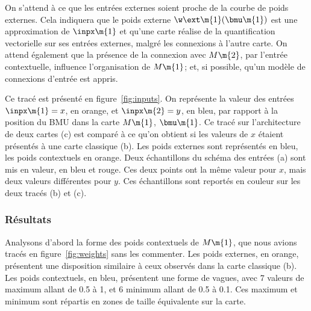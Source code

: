 On s'attend à ce que les entrées externes soient proche de la courbe de poids externes. Cela indiquera que le poids externe $\w\ext\m{1}(\bmu\m{1})$ est une approximation de $\inpx\m{1}$ et qu'une carte réalise de la quantification vectorielle sur ses entrées externes, malgré les connexions à l'autre carte. On attend également que la présence de la connexion avec $M\m{2}$, par l'entrée contextuelle, influence l'organisation de $M\m{1}$; et, si possible, qu'un modèle de connexions d'entrée est appris.

Ce tracé est présenté en figure~\ref{fig:inputs}. On représente la valeur des entrées $\inpx\m{1} = x$, en orange, et $\inpx\m{2}=y$, en bleu, par rapport à la position du BMU dans la carte $M\m{1}$, $\bmu\m{1}$. Ce tracé sur l'architecture de deux cartes (c) est comparé à ce qu'on obtient si les valeurs de $x$ étaient présentés à une carte classique (b). Les poids externes sont représentés en bleu, les poids contextuels en orange. Deux échantillons du schéma des entrées (a) sont mis en valeur, en bleu et rouge. Ces deux points ont la même valeur pour $x$, mais deux valeurs différentes pour $y$. Ces échantillons sont reportés en couleur sur les deux tracés (b) et (c).
\subsubsection{Résultats}
Analysons d'abord la forme des poids contextuels de $M\m{1}$, que nous avions tracés en figure~\ref{fig:weights} sans les commenter. Les poids externes, en orange, présentent une disposition similaire à ceux observés dans la carte classique (b). Les poids contextuels, en bleu, présentent une forme de vagues, avec 7 valeurs de maximum allant de 0.5 à 1, et 6 minimum allant de 0.5 à 0.1. Ces maximum et minimum sont répartis en zones de taille équivalente sur la carte. 

